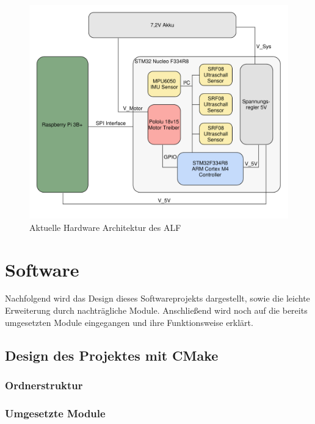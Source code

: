\begin{figure}[hbtp]
\centering
\includegraphics[scale=0.5]{images/chapter5/HW-Architecture.pdf}
\caption{Aktuelle Hardware Architektur des ALF \label{fig:IfBoardHWUebersicht}}
\end{figure}















\chapter{Software}
Nachfolgend wird das Design dieses Softwareprojekts dargestellt, sowie die leichte Erweiterung durch nachträgliche Module. Anschließend wird noch auf die bereits umgesetzten Module eingegangen und ihre Funktionsweise erklärt. 

\section{Design des Projektes mit CMake}


\subsection{Ordnerstruktur}

\subsection{Umgesetzte Module}

